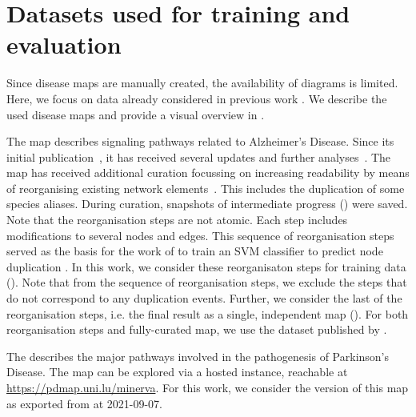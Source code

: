\documentclass[
	fontsize=10pt, %
	twoside=false, %
	secnumdepth=1, %
  toc=indentunnumbered %
]{kaobook}
\begin{document}
\section{Datasets used for training and evaluation}
\label{sec:datasets-used}

Since disease maps are manually created, the availability of diagrams is
limited.
Here, we focus on data already considered in previous work
\cite{nielsen_MachineLearningSupport_2019}. We describe the used disease maps
and provide a visual overview in .

The  map describes signaling pathways related to Alzheimer's
Disease. Since its initial publication~\cite{mizuno_AlzPathwayComprehensiveMap_2012}, it has received several updates
and further analyses~\cite{ogishima_MapAlzheimerDiseasesignaling_2013,
  ogishima_AlzPathwayUpdatedMap_2016, mizuno_NetworkAnalysisComprehensive_2016}.
%
The map has received additional curation focussing on increasing readability by
means of reorganising existing network elements~\cite{ostaszewski_AlzPathwayRegorganisationSteps_2021}. This includes the
duplication of some species aliases. During curation, snapshots of intermediate
progress () were saved. Note that the reorganisation
steps are not atomic. Each step includes modifications to several nodes and
edges. This sequence of reorganisation steps served as the basis for the work of
\citeauthor{nielsen_MachineLearningSupport_2019} to train an SVM classifier to
predict node duplication \cite{nielsen_MachineLearningSupport_2019}. In this
work, we consider these reorganisaton steps for training data
(). Note that from the sequence of reorganisation
steps, we exclude the steps that do not correspond to any duplication events.
Further, we consider the last of the reorganisation steps, i.e. the final result
as a single, independent map (). For both
reorganisation steps and fully-curated map, we use the dataset published by
\citeauthor{ostaszewski_AlzPathwayRegorganisationSteps_2021}
\cite{ostaszewski_AlzPathwayRegorganisationSteps_2021}.

The  \cite{fujita_IntegratingPathwaysParkinson_2014} describes the
major pathways involved in the pathogenesis of Parkinson's Disease. The map can
be explored via a hosted  instance, reachable at
\url{https://pdmap.uni.lu/minerva}. For this work, we consider the version of
this map as exported from  at 2021-09-07.
\end{document}
